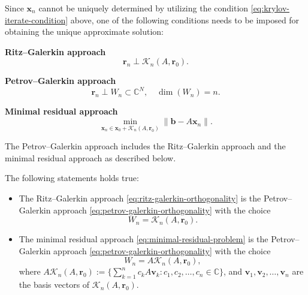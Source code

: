 Since $\bm x_n$ cannot be uniquely determined by utilizing the condition \eqref{eq:krylov-iterate-condition} above, one of the following conditions needs to be imposed for obtaining the unique approximate solution:

\noindent\textbf{Ritz--Galerkin approach}
\begin{equation}\label{eq:ritz-galerkin-orthogonality}
\bm r_n\perp\mathcal K_n(A,\bm r_0).
\end{equation}

\noindent\textbf{Petrov--Galerkin approach}
\begin{equation}\label{eq:petrov-galerkin-orthogonality}
\bm r_n\perp W_n\subset\mathbb C^N,\quad\dim(W_n)=n.
\end{equation}

\noindent\textbf{Minimal residual approach}
\begin{equation}\label{eq:minimal-residual-problem}
\min_{\bm x_n\in\bm x_0+\mathcal K_n(A,\bm r_0)}\|\bm b-A\bm x_n\|.
\end{equation}

The Petrov--Galerkin approach includes the Ritz--Galerkin approach and the minimal residual approach as described below.

\begin{Proposition}\label{prop:projection-equivalences}
The following statements holds true:
\begin{itemize}
\item The Ritz--Galerkin approach \eqref{eq:ritz-galerkin-orthogonality} is the Petrov--Galerkin approach \eqref{eq:petrov-galerkin-orthogonality} with the choice
\[
W_n=\mathcal K_n(A,\bm r_0).
\]
\item The minimal residual approach \eqref{eq:minimal-residual-problem} is the Petrov--Galerkin approach \eqref{eq:petrov-galerkin-orthogonality} with the choice
\begin{equation}\label{eq:minimal-residual-test-space}
W_n=A\mathcal K_n(A,\bm r_0),
\end{equation}
where $A\mathcal K_n(A,\bm r_0):=\{\sum_{k=1}^n c_kA\bm v_k:c_1,c_2,\ldots,c_n\in\mathbb C\}$, and $\bm v_1,\bm v_2,\ldots,\bm v_n$ are the basis vectors of $\mathcal K_n(A,\bm r_0)$.
\end{itemize}
\end{Proposition}

